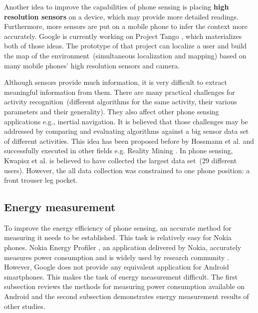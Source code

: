 Another idea to improve the capabilities of phone sensing is placing \textbf{high resolution sensors} on a device, which may provide more detailed readings. Furthermore, more sensors are put on a mobile phone to infer the context more accurately. Google is currently working on Project Tango \cite{google:tango}, which materializes both of those ideas. The prototype of that project can localize a user and build the map of the environment\ (simultaneous localization and mapping) based on many mobile phones' high resolution sensors and camera. 		
		
Although sensors provide much information, it is very difficult to extract meaningful information from them. There are many practical challenges for activity recognition\ (different algorithms for the same activity, their various parameters and their generality). They also affect other phone sensing applications e.g., inertial navigation. It is believed that those challenges may be addressed by comparing and evaluating algorithms against a big sensor data set of different activities. This idea has been proposed before by Hossmann et al.\cite{hossmann:bigdatasets} and successfully executed in other fields e.g. Reality Mining \cite{eagle:realitymining}. In phone sensing, Kwapisz et al. \cite{Kwapisz2011} is believed to have collected the largest data set\ (29 different users). However, the all data collection was constrained to one phone position: a front trouser leg pocket. 
		
\subsection{Energy measurement}
\hspace{10pt} To improve the energy efficiency of phone sensing, an accurate method for measuring it needs to be established. This task is relatively easy for Nokia phones. Nokia Energy Profiler \cite{nokia:profiler}, an application delivered by Nokia,  accurately measures power consumption and is widely used by research community \cite{kjaergaard:entracked} \cite{lu:jigsaw} \cite{li:status}. However, Google does not provide any equivalent application for Android smartphones. This makes the task of energy measurement difficult. The first subsection reviews the methods for measuring power consumption available on Android and the second subsection demonstrates energy measurement results of other studies.

